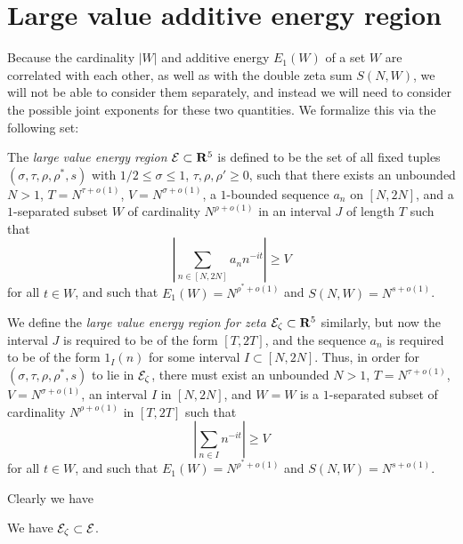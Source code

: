 \section{Large value additive energy region}

Because the cardinality $|W|$ and additive energy $E_1(W)$ of a set $W$ are correlated with each other, as well as with the double zeta sum $S(N,W)$, we will not be able to consider them separately, and instead we will need to consider the possible joint exponents for these two quantities.  We formalize this via the following set:

\begin{definition}\label{lv-edef} The \emph{large value energy region} $\mathcal{E} \subset \mathbf{R}^5$ is defined to be the set of all fixed tuples $(\sigma,\tau,\rho,\rho^*,s)$ with $1/2 \leq \sigma \leq 1$, $\tau, \rho, \rho' \geq 0$, such that there exists an unbounded $N > 1$, $T = N^{\tau+o(1)}$, $V = N^{\sigma+o(1)}$, a $1$-bounded sequence  $a_n$ on $[N,2N]$, and a  $1$-separated subset $W$ of cardinality $N^{\rho+o(1)}$ in an interval $J$ of length $T$ such that
    \begin{equation}\label{sig-large} \left|\sum_{n \in [N,2N]} a_n n^{-it} \right| \geq V
\end{equation}
for all $t \in W$, and such that $E_1(W) = N^{\rho^*+o(1)}$ and $S(N,W) = N^{s+o(1)}$.

We define the \emph{large value energy region for zeta} $\mathcal{E}_\zeta \subset \mathbf{R}^5$ similarly, but now the interval $J$ is required to be of the form $[T,2T]$, and the sequence $a_n$ is required to be of the form $1_I(n)$ for some interval $I \subset [N,2N]$.  Thus, in order for $(\sigma,\tau,\rho,\rho^*,s)$ to lie in $\mathcal{E}_\zeta$, there must exist an unbounded $N > 1$, $T = N^{\tau+o(1)}$, $V = N^{\sigma+o(1)}$, an interval $I$ in $[N,2N]$, and  $W = W$ is a $1$-separated subset of cardinality $N^{\rho+o(1)}$ in $[T,2T]$ such that
\begin{equation}\label{sig-large-zeta} \left|\sum_{n \in I} n^{-it} \right| \geq V
\end{equation}
for all $t \in W$, and such that $E_1(W) = N^{\rho^*+o(1)}$ and $S(N,W) = N^{s+o(1)}$.
\end{definition}

Clearly we have

\begin{lemma} We have $\mathcal{E}_\zeta \subset \mathcal{E}$.
\end{lemma}

